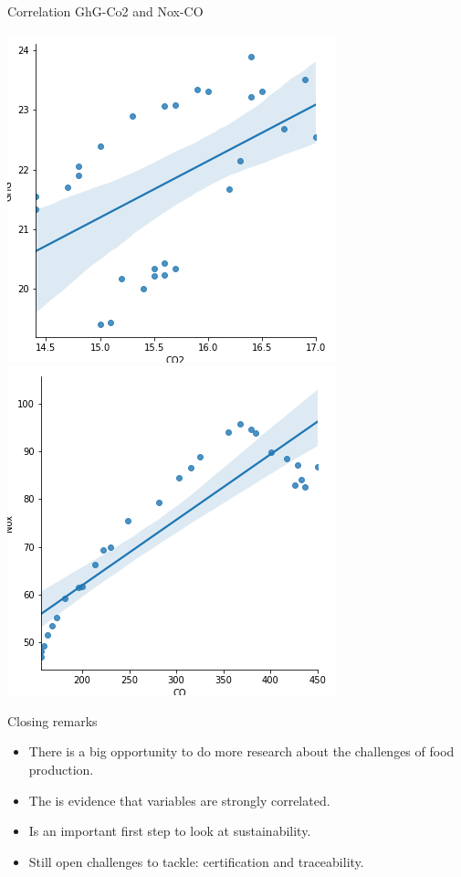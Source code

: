 \documentclass[t,9pt,aspectratio=169]{beamer}
\begin{document}
\begin{frame}{Correlation GhG-Co2 and Nox-CO}
\begin{center}
\includegraphics[scale=0.4 ]{./figures/corr_CO2_GHG} \includegraphics[scale=0.4]{./figures/corr_CO_NOX} 
\end{center}
\end{frame}  

\begin{frame}{Closing remarks}
\begin{block}{}
\begin{itemize}
\item There is a big opportunity  to do more research about the challenges of food production.
\item The is evidence that variables are strongly correlated.
\item Is an important first step to look at sustainability.
\item Still open challenges to tackle: certification and traceability.
\end{itemize}
\end{block}
\end{frame}
\end{document}
